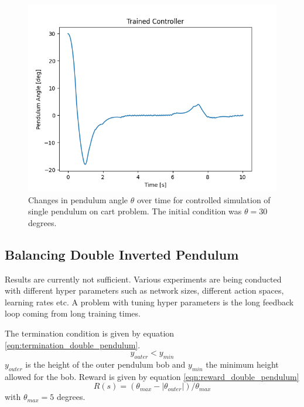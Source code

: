 \documentclass{LTHtwocol} %
\begin{document}
\begin{figure}[H]
	\centering
	\includegraphics[width=0.9\columnwidth]{figures/Pendulum_angle_30.png}
	\caption{Changes in pendulum angle $\theta$ over time for controlled simulation of single pendulum on cart problem. The initial condition was $\theta = 30$ degrees.}
	\label{fig:single_pendulum_outside_training_domain}
\end{figure}



\subsection{Balancing Double Inverted Pendulum}
Results are currently not sufficient.
Various experiments are being conducted with different hyper parameters such as network sizes, different action spaces, learning rates etc.
A problem with tuning hyper parameters is the long feedback loop coming from long training times.

The termination condition is given by equation \eqref{eqn:termination_double_pendulum}.
\begin{equation}
	\label{eqn:termination_double_pendulum}
	y_{outer} < y_{min}
\end{equation}
$y_{outer}$ is the height of the outer pendulum bob and $y_{min}$ the minimum height allowed for the bob.
Reward is given by equation \eqref{eqn:reward_double_pendulum}
\begin{equation}
	\label{eqn:reward_double_pendulum}
	R(s) = (\theta_{max} - |\theta_{outer}|) / \theta_{max}
\end{equation}
with $\theta_{max} = 5$ degrees.
\end{document}
